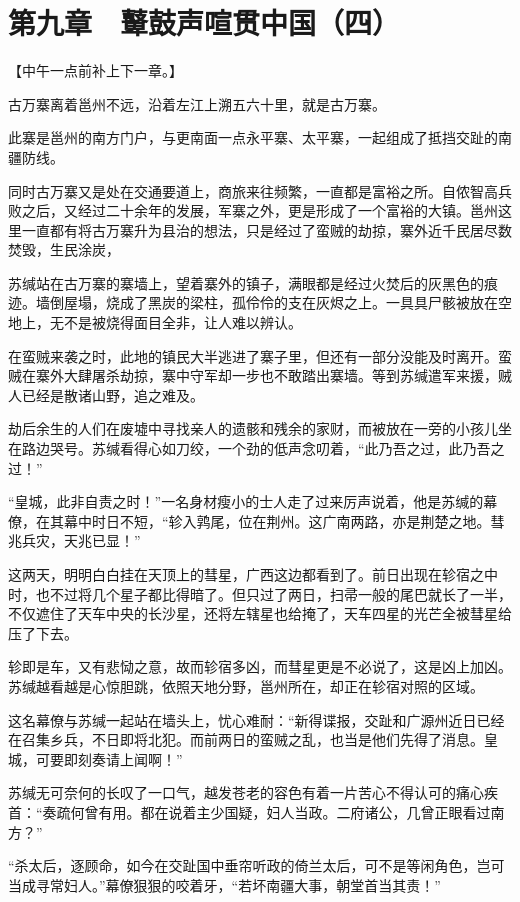 \section{第九章　鼙鼓声喧贯中国（四）}

【中午一点前补上下一章。】

古万寨离着邕州不远，沿着左江上溯五六十里，就是古万寨。

此寨是邕州的南方门户，与更南面一点永平寨、太平寨，一起组成了抵挡交趾的南疆防线。

同时古万寨又是处在交通要道上，商旅来往频繁，一直都是富裕之所。自侬智高兵败之后，又经过二十余年的发展，军寨之外，更是形成了一个富裕的大镇。邕州这里一直都有将古万寨升为县治的想法，只是经过了蛮贼的劫掠，寨外近千民居尽数焚毁，生民涂炭，

苏缄站在古万寨的寨墙上，望着寨外的镇子，满眼都是经过火焚后的灰黑色的痕迹。墙倒屋塌，烧成了黑炭的梁柱，孤伶伶的支在灰烬之上。一具具尸骸被放在空地上，无不是被烧得面目全非，让人难以辨认。

在蛮贼来袭之时，此地的镇民大半逃进了寨子里，但还有一部分没能及时离开。蛮贼在寨外大肆屠杀劫掠，寨中守军却一步也不敢踏出寨墙。等到苏缄遣军来援，贼人已经是散诸山野，追之难及。

劫后余生的人们在废墟中寻找亲人的遗骸和残余的家财，而被放在一旁的小孩儿坐在路边哭号。苏缄看得心如刀绞，一个劲的低声念叨着，“此乃吾之过，此乃吾之过！”

“皇城，此非自责之时！”一名身材瘦小的士人走了过来厉声说着，他是苏缄的幕僚，在其幕中时日不短，“轸入鹑尾，位在荆州。这广南两路，亦是荆楚之地。彗兆兵灾，天兆已显！”

这两天，明明白白挂在天顶上的彗星，广西这边都看到了。前日出现在轸宿之中时，也不过将几个星子都比得暗了。但只过了两日，扫帚一般的尾巴就长了一半，不仅遮住了天车中央的长沙星，还将左辖星也给掩了，天车四星的光芒全被彗星给压了下去。

轸即是车，又有悲恸之意，故而轸宿多凶，而彗星更是不必说了，这是凶上加凶。苏缄越看越是心惊胆跳，依照天地分野，邕州所在，却正在轸宿对照的区域。

这名幕僚与苏缄一起站在墙头上，忧心难耐：“新得谍报，交趾和广源州近日已经在召集乡兵，不日即将北犯。而前两日的蛮贼之乱，也当是他们先得了消息。皇城，可要即刻奏请上闻啊！”

苏缄无可奈何的长叹了一口气，越发苍老的容色有着一片苦心不得认可的痛心疾首：“奏疏何曾有用。都在说着主少国疑，妇人当政。二府诸公，几曾正眼看过南方？”

“杀太后，逐顾命，如今在交趾国中垂帘听政的倚兰太后，可不是等闲角色，岂可当成寻常妇人。”幕僚狠狠的咬着牙，“若坏南疆大事，朝堂首当其责！”

